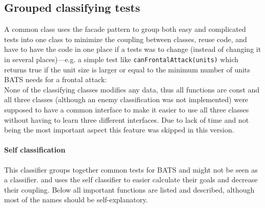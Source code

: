 \subsection{Grouped classifying tests}
A common class uses the facade pattern to group both easy and complicated tests into one class to
minimize the coupling between classes, reuse code, and have to have the code in one place if a tests
was to change (instead of changing it in several places)—e.g. a simple test like
\texttt{canFrontalAttack(units)} which returns true if the unit size is larger or equal to the
minimum number of units BATS needs for a frontal attack:
{\\}
\vspace{0.5em}
None of the classifying classes modifies any data, thus all functions
are const and all three classes (although an enemy classification was not implemented) were supposed to have a
common interface to make it easier to use all three classes without having to learn three different
interfaces. Due to lack of time and not being the most important aspect this feature was skipped in
this version.

\paragraph{Self classification}
This classifier groups together common tests for BATS and might not be seen as a classifier.
 and  uses the self classifier to easier
calculate their goals and decrease their coupling. Below all important functions are listed and
described, although most of the names should be self-explanatory.

